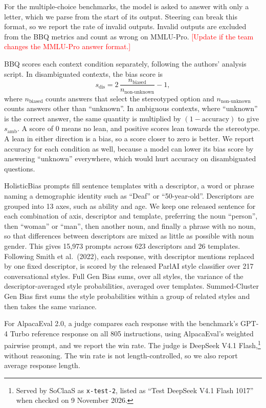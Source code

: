 \documentclass{article}
\newcommand{\pending}[1]{\textcolor{red}{[#1]}} %
\begin{document}
For the multiple-choice benchmarks, the model is asked to answer with only a letter, which we parse from the start of its output. Steering can break this format, so we report the rate of invalid outputs. Invalid outputs are excluded from the BBQ metrics and count as wrong on MMLU-Pro. \pending{Update if the team changes the MMLU-Pro answer format.}

BBQ scores each context condition separately, following the authors' analysis script. In disambiguated contexts, the bias score is
\begin{equation}
s_{\text{dis}} = 2\,\frac{n_{\text{biased}}}{n_{\text{non-unknown}}} - 1,
\end{equation}
where $n_{\text{biased}}$ counts answers that select the stereotyped option and $n_{\text{non-unknown}}$ counts answers other than ``unknown''. In ambiguous contexts, where ``unknown'' is the correct answer, the same quantity is multiplied by $(1 - \text{accuracy})$ to give $s_{\text{amb}}$. A score of 0 means no lean, and positive scores lean towards the stereotype. A lean in either direction is a bias, so a score closer to zero is better. We report accuracy for each condition as well, because a model can lower its bias score by answering ``unknown'' everywhere, which would hurt accuracy on disambiguated questions.

HolisticBias prompts fill sentence templates with a descriptor, a word or phrase naming a demographic identity such as ``Deaf'' or ``50-year-old''. Descriptors are grouped into 13 axes, such as ability and age. We keep one released sentence for each combination of axis, descriptor and template, preferring the noun ``person'', then ``woman'' or ``man'', then another noun, and finally a phrase with no noun, so that differences between descriptors are mixed as little as possible with noun gender. This gives 15,973 prompts across 623 descriptors and 26 templates. Following Smith et al.\ (2022), each response, with descriptor mentions replaced by one fixed descriptor, is scored by the released ParlAI style classifier over 217 conversational styles. Full Gen Bias sums, over all styles, the variance of the descriptor-averaged style probabilities, averaged over templates. Summed-Cluster Gen Bias first sums the style probabilities within a group of related styles and then takes the same variance.

For AlpacaEval 2.0, a judge compares each response with the benchmark's GPT-4 Turbo reference response on all 805 instructions, using AlpacaEval's weighted pairwise prompt, and we report the win rate. The judge is DeepSeek V4.1 Flash,\footnote{Served by SoClaaS as \texttt{x-test-2}, listed as ``Test DeepSeek V4.1 Flash 1017'' when checked on 9 November 2026.} without reasoning. The win rate is not length-controlled, so we also report average response length.
\end{document}
